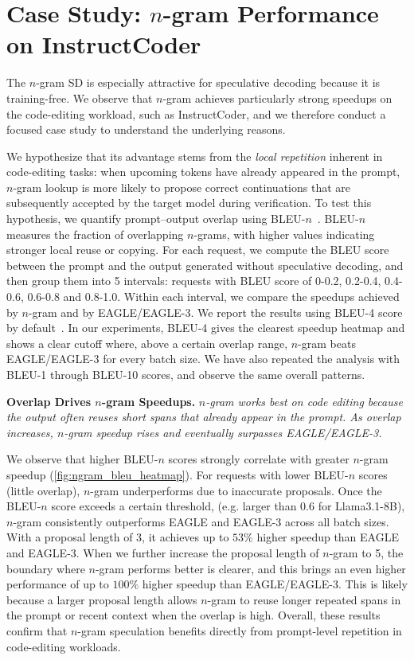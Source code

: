 \section{Case Study: $n$-gram Performance on InstructCoder}
\label{subsect:ngram-bleu-score}


The $n$-gram SD is especially attractive for speculative decoding because it is training-free.
We observe that $n$-gram achieves particularly strong speedups on the code-editing workload, such as InstructCoder, and we therefore conduct a focused case study to understand the underlying reasons.

We hypothesize that its advantage stems from the \emph{local repetition} inherent in code-editing tasks: when upcoming tokens have already appeared in the prompt, $n$-gram lookup is more likely to propose correct continuations that are subsequently accepted by the target model during verification.
To test this hypothesis, we quantify prompt–output overlap using BLEU-$n$~\cite{papineni2002bleu}.
BLEU-$n$ measures the fraction of overlapping $n$-grams, with higher values indicating stronger local reuse or copying.
For each request, we compute the BLEU score between the prompt and the output generated without speculative decoding, and then group them into 5 intervals: requests with BLEU score of 0-0.2, 0.2-0.4, 0.4-0.6, 0.6-0.8 and 0.8-1.0.
Within each interval, we compare the speedups achieved by $n$-gram and by EAGLE/EAGLE-3.
We report the results using BLEU-4 score by default~\cite{papineni2002bleu}. In our experiments, BLEU-4 gives the clearest speedup heatmap and shows a clear cutoff where, above a certain overlap range, $n$-gram beats EAGLE/EAGLE-3 for every batch size. We have also repeated the analysis with BLEU-1 through BLEU-10 scores, and observe the same overall patterns.

\begin{quoting}[leftmargin=1.5em, rightmargin=1.5em, vskip=0pt]
\textbf{Overlap Drives $n$-gram Speedups.}
\emph{$n$-gram works best on code editing because the output often reuses short spans that already appear in the prompt. As overlap increases, $n$-gram speedup rises and eventually surpasses EAGLE/EAGLE-3.}
\end{quoting}
We observe that higher BLEU-$n$ scores strongly correlate with greater $n$-gram speedup (\autoref{fig:ngram_bleu_heatmap}). 
For requests with lower BLEU-$n$ scores (little overlap), $n$-gram underperforms due to inaccurate proposals. Once the BLEU-$n$ score exceeds a certain threshold, (e.g. larger than $0.6$ for Llama3.1-8B), $n$-gram consistently outperforms EAGLE and EAGLE-3 across all batch sizes. With a proposal length of 3, it achieves up to $53\%$ higher speedup than EAGLE and EAGLE-3. When we further increase the proposal length of $n$-gram to 5, the boundary where $n$-gram performs better is clearer, and this brings an even higher performance of up to $100\%$ higher speedup than EAGLE/EAGLE-3.
This is likely because a larger proposal length allows $n$-gram to reuse longer repeated spans in the prompt or recent context when the overlap is high. 
Overall, these results confirm that $n$-gram speculation benefits directly from prompt-level repetition in code-editing workloads. 

